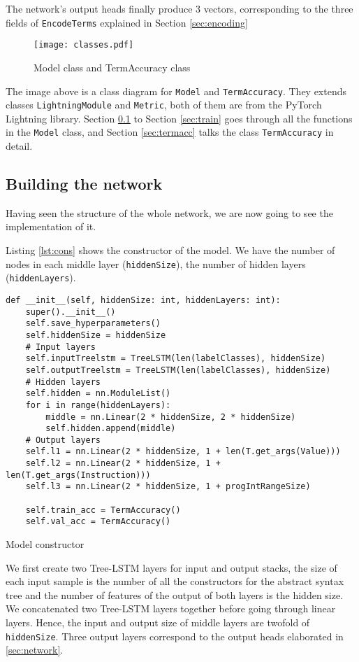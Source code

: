 The network's output heads finally produce 3 vectors, corresponding to the three fields of \texttt{EncodeTerms} explained in Section \ref{sec:encoding} 

\begin{figure}[H]
    \centering
    \texttt{[image: classes.pdf]}
    \caption{Model class and TermAccuracy class}
    \label{fig:classes}
\end{figure}

The image above is a class diagram for \texttt{Model} and \texttt{TermAccuracy}. They extends classes \texttt{LightningModule} and \texttt{Metric}, both of them are from the PyTorch Lightning \cite{pytorch-ligntning} library. Section \ref{sec:buildnn} to Section \ref{sec:train} goes through all the functions in the \texttt{Model} class, and Section \ref{sec:termacc} talks the class \texttt{TermAccuracy} in detail.

\subsection{Building the network}
\label{sec:buildnn}
Having seen the structure of the whole network, we are now going to see the implementation of it. 

Listing \ref{lst:cons} shows the constructor of the model. We have the number of nodes in each middle layer (\texttt{hiddenSize}), the number of hidden layers (\texttt{hiddenLayers}).

\begin{listing}[H]
\begin{verbatim}
def __init__(self, hiddenSize: int, hiddenLayers: int):
    super().__init__()
    self.save_hyperparameters()
    self.hiddenSize = hiddenSize
    # Input layers
    self.inputTreelstm = TreeLSTM(len(labelClasses), hiddenSize)
    self.outputTreelstm = TreeLSTM(len(labelClasses), hiddenSize)
    # Hidden layers
    self.hidden = nn.ModuleList()
    for i in range(hiddenLayers):
        middle = nn.Linear(2 * hiddenSize, 2 * hiddenSize)
        self.hidden.append(middle)
    # Output layers
    self.l1 = nn.Linear(2 * hiddenSize, 1 + len(T.get_args(Value)))
    self.l2 = nn.Linear(2 * hiddenSize, 1 + len(T.get_args(Instruction)))
    self.l3 = nn.Linear(2 * hiddenSize, 1 + progIntRangeSize)
    
    self.train_acc = TermAccuracy()
    self.val_acc = TermAccuracy()
\end{verbatim}
\caption{Model constructor}
\label{lst:cons}
\end{listing}
We first create two Tree-LSTM layers for input and output stacks, the size of each input sample is the number of all the constructors for the abstract syntax tree and the number of features of the output of both layers is the hidden size. We concatenated two Tree-LSTM layers together before going through linear layers. Hence, the input and output size of middle layers are twofold of \texttt{hiddenSize}. Three output layers correspond to the output heads elaborated in \ref{sec:network}. 

